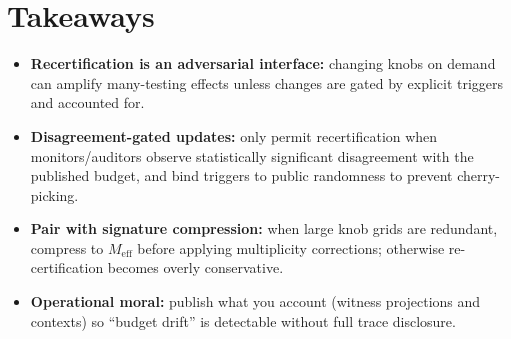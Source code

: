 \documentclass[11pt]{article}
\begin{document}
\section{Takeaways}
\begin{itemize}[leftmargin=*]
\item \textbf{Recertification is an adversarial interface:} changing knobs on demand can amplify many-testing effects unless changes are gated by explicit triggers and accounted for.
\item \textbf{Disagreement-gated updates:} only permit recertification when monitors/auditors observe statistically significant disagreement with the published budget, and bind triggers to public randomness to prevent cherry-picking.
\item \textbf{Pair with signature compression:} when large knob grids are redundant, compress to $M_{\mathrm{eff}}$ before applying multiplicity corrections; otherwise re-certification becomes overly conservative.
\item \textbf{Operational moral:} publish what you account (witness projections and contexts) so ``budget drift'' is detectable without full trace disclosure.
\end{itemize}
\end{document}
